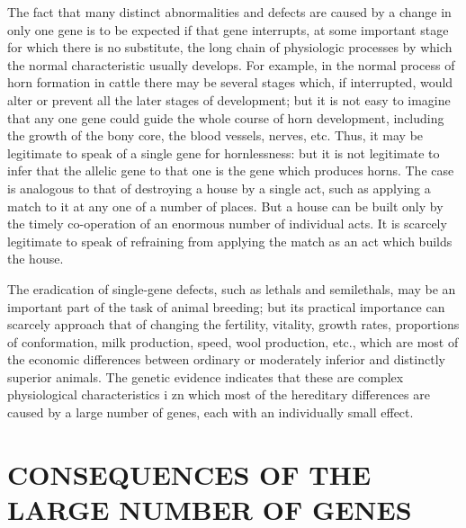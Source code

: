 The fact that many distinct abnormalities and defects are caused by
a change in only one gene is to be expected if that gene interrupts, at
some important stage for which there is no substitute, the long chain of
physiologic processes by which the normal characteristic usually develops.
For example, in the normal process of horn formation in cattle
there may be several stages which, if interrupted, would alter or prevent
all the later stages of development; but it is not easy to imagine that
any one gene could guide the whole course of horn development,
including the growth of the bony core, the blood vessels, nerves, etc.
Thus, it may be legitimate to speak of a single gene for hornlessness:
but it is not legitimate to infer that the allelic gene to that one is the
gene which produces horns. The case is analogous to that of destroying
a house by a single act, such as applying a match to it at any one of a
number of places. But a house can be built only by the timely co-operation
of an enormous number of individual acts. It is scarcely legitimate
to speak of refraining from applying the match as an act which builds
the house.

The eradication of single-gene defects, such as lethals and semilethals,
may be an important part of the task of animal breeding; but its
practical importance can scarcely approach that of changing the fertility,
vitality, growth rates, proportions of conformation, milk production,
speed, wool production, etc., which are most of the economic
differences between ordinary or moderately inferior and distinctly
superior animals. The genetic evidence indicates that these are complex
physiological characteristics i zn which most of the hereditary
differences are caused by a large number of genes, each with an individually
small effect.

\section*{CONSEQUENCES OF THE LARGE NUMBER OF GENES}

